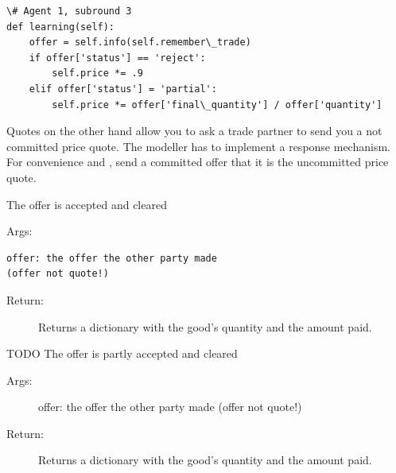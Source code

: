 \documentclass[letterpaper,10pt,english]{sphinxmanual}
\begin{document}
\begin{fulllineitems}
\begin{Verbatim}[commandchars=\\\{\}]
\# Agent 1, subround 3
def learning(self):
    offer = self.info(self.remember\_trade)
    if offer['status'] == 'reject':
        self.price *= .9
    elif offer['status'] = 'partial':
        self.price *= offer['final\_quantity'] / offer['quantity']
\end{Verbatim}

Quotes on the other hand allow you to ask a trade partner to send you a not committed price quote.
The modeller has to implement a response mechanism. For convenience  and
, send a committed offer that it is the uncommitted price quote.

\begin{fulllineitems}
\label{Trade:abce.Trade.accept}
The offer is accepted and cleared

Args:

\begin{Verbatim}[commandchars=\\\{\}]
offer: the offer the other party made
(offer not quote!)
\end{Verbatim}
\begin{description}
\item[{Return:}] \leavevmode
Returns a dictionary with the good's quantity and the amount paid.

\end{description}

\end{fulllineitems}


\begin{fulllineitems}
\label{Trade:abce.Trade.accept_max_possible}
TODO The offer is partly accepted and cleared
\begin{description}
\item[{Args:}] \leavevmode
offer: the offer the other party made
(offer not quote!)

\item[{Return:}] \leavevmode
Returns a dictionary with the good's quantity and the amount paid.

\end{description}

\end{fulllineitems}


\end{fulllineitems}
\end{document}
